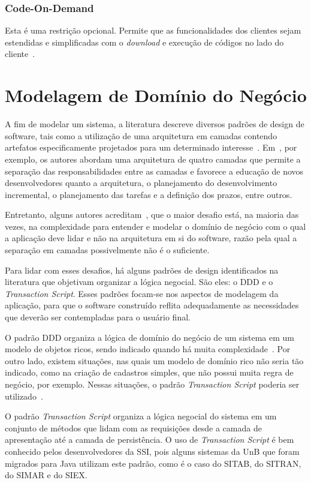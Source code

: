 \subsubsection{Code-On-Demand}

Esta é uma restrição opcional. Permite que as funcionalidades dos clientes sejam estendidas 
e simplificadas com o \textit{download} e execução de códigos no lado do 
cliente~\cite{fielding2000architectural}.



\section{Modelagem de Domínio do Negócio}%
\label{design_proj}

A fim de modelar um sistema, 
a literatura descreve diversos 
padrões de design de software, 
tais como a utilização de
uma arquitetura em 
camadas contendo 
artefatos especificamente projetados 
para um determinado
interesse~\cite{clements2002documenting, OORP2013, evans2004domain, fowler2002patterns, 
SOAIntBlueprint:2010, panda2007ejb, stal2006using}. 
Em~\cite{panda2007ejb}, por exemplo,
os autores abordam uma arquitetura de quatro 
camadas que permite a separação das responsabilidades entre 
as camadas e favorece a educação de novos desenvolvedores quanto a arquitetura, o planejamento do desenvolvimento incremental, o planejamento das tarefas e a definição dos prazos, entre outros.

Entretanto, alguns autores acreditam~\cite{S3_Bisbal:1999,evans2004domain,fowler2002patterns,stal2006using}, que o maior desafio está, na maioria das vezes, na complexidade para entender e modelar o domínio de negócio
com o qual a aplicação deve lidar e não na arquitetura em si do software, razão pela qual a separação em camadas possivelmente não é o suficiente. 

Para lidar com esses desafios, há alguns padrões de design identificados 
na literatura que objetivam organizar a lógica negocial. São eles: o \acrfull{DDD} e o \textit{Transaction Script}. 
Esses padrões focam-se nos aspectos de modelagem da aplicação, para que o software construído reflita adequadamente as necessidades que deverão ser contempladas para o usuário final. 

O padrão \acrshort{DDD} organiza a lógica de
domínio do negócio de um sistema em um modelo de objetos ricos, sendo indicado quando
há muita complexidade~\cite{evans2004domain, stal2006using}. Por outro lado, existem situações, nas quais um modelo de domínio rico não seria tão indicado, como na criação de cadastros simples, que não possui muita regra de negócio, por exemplo. Nessas situações, o padrão \textit{Transaction Script} poderia ser utilizado~\cite{evans2004domain}.

O padrão \textit{Transaction Script} organiza a lógica negocial do sistema em um conjunto de métodos que lidam com as requisições desde a camada de apresentação até a camada de persistência. 
O uso de \textit{Transaction Script} é bem conhecido pelos desenvolvedores da \acrfull{SSI}, pois alguns sistemas da \acrshort{UnB} que foram migrados para Java utilizam este padrão, como é o caso do \acrfull{SITAB}, do \acrfull{SITRAN}, do \acrfull{SIMAR} e do \acrfull{SIEX}. 
